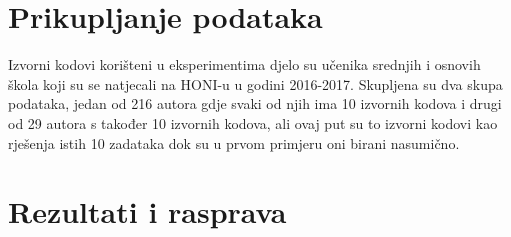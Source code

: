 \section{Prikupljanje podataka}
Izvorni kodovi korišteni u eksperimentima djelo su učenika srednjih i osnovih škola koji su se natjecali na HONI-u \cite{honi} u godini 2016-2017. Skupljena su dva skupa podataka, jedan od 216 autora gdje svaki od njih ima 10 izvornih kodova i drugi od 29 autora s također 10 izvornih kodova, ali ovaj put su to izvorni kodovi kao rješenja istih 10 zadataka dok su u prvom primjeru oni birani nasumično. 

\section{Rezultati i rasprava} \label{results}


